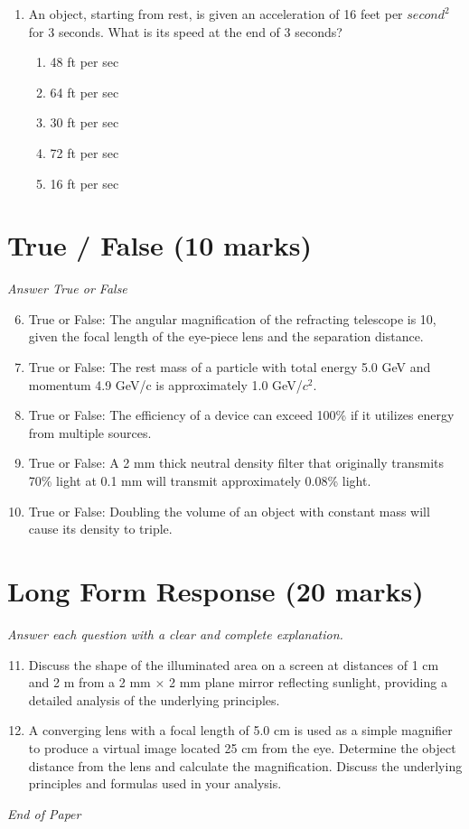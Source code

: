 \documentclass[12pt]{article}
\begin{document}
\begin{enumerate}[label=\arabic*.]
\begin{enumerate}[label=(\alph*)]
    \item Ursa Major
    \item Sagittarius
    \item Aquila
\end{enumerate}
\item An object, starting from rest, is given an acceleration of 16 feet per $second^2$ for 3 seconds. What is its speed at the end of 3 seconds?
\begin{enumerate}[label=(\alph*)]
    \item 48 ft per sec
    \item 64 ft per sec
    \item 30 ft per sec
    \item 72 ft per sec
    \item 16 ft per sec
\end{enumerate}
\end{enumerate}

\section*{True / False (10 marks)}
\textit{Answer True or False}
\begin{enumerate}[label=\arabic*.]
\setcounter{enumi}{5}
\item True or False: The angular magnification of the refracting telescope is 10, given the focal length of the eye-piece lens and the separation distance.
\item True or False: The rest mass of a particle with total energy 5.0 GeV and momentum 4.9 GeV/c is approximately 1.0 GeV/$c^2$.
\item True or False: The efficiency of a device can exceed 100\% if it utilizes energy from multiple sources.
\item True or False: A 2 mm thick neutral density filter that originally transmits 70\% light at 0.1 mm will transmit approximately 0.08\% light.
\item True or False: Doubling the volume of an object with constant mass will cause its density to triple.
\end{enumerate}

\section*{Long Form Response (20 marks)}
\textit{Answer each question with a clear and complete explanation.}
\begin{enumerate}[label=\arabic*.]
\setcounter{enumi}{10}
\item Discuss the shape of the illuminated area on a screen at distances of 1 cm and 2 m from a 2 mm \ensuremath{\times} 2 mm plane mirror reflecting sunlight, providing a detailed analysis of the underlying principles.
\item A converging lens with a focal length of 5.0 cm is used as a simple magnifier to produce a virtual image located 25 cm from the eye. Determine the object distance from the lens and calculate the magnification. Discuss the underlying principles and formulas used in your analysis.
\end{enumerate}

\vfill
\noindent\textit{End of Paper}
\end{document}
